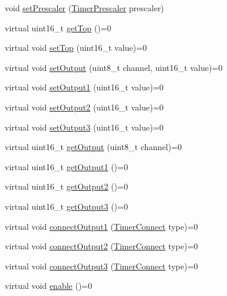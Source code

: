 \begin{DoxyCompactItemize}
void \hyperlink{classflame_1_1_timer_a3a937b5424a565d63308aad19254fe7f}{set\-Prescaler} (\hyperlink{namespaceflame_a24dfd057ba5ab5a827abbc4ed902a087}{Timer\-Prescaler} prescaler)
\item 
virtual uint16\-\_\-t \hyperlink{classflame_1_1_timer_ae7531c4df336c5c70e751581c3c37b4c}{get\-Top} ()=0
\item 
virtual void \hyperlink{classflame_1_1_timer_a32523c61b521a74fe4c21cff0332a9e7}{set\-Top} (uint16\-\_\-t value)=0
\item 
virtual void \hyperlink{classflame_1_1_timer_a7eb534c6d2b55b329207d8e8f8f7538c}{set\-Output} (uint8\-\_\-t channel, uint16\-\_\-t value)=0
\item 
virtual void \hyperlink{classflame_1_1_timer_ad5ebb60ff42ff1e8808d867da1d2dfac}{set\-Output1} (uint16\-\_\-t value)=0
\item 
virtual void \hyperlink{classflame_1_1_timer_ac9844c4f69ff804e754d74a4a07a1208}{set\-Output2} (uint16\-\_\-t value)=0
\item 
virtual void \hyperlink{classflame_1_1_timer_a542f70b81da2198bb6839ae15980dea2}{set\-Output3} (uint16\-\_\-t value)=0
\item 
virtual uint16\-\_\-t \hyperlink{classflame_1_1_timer_a29af3ec15a5669430a95a83727097432}{get\-Output} (uint8\-\_\-t channel)=0
\item 
virtual uint16\-\_\-t \hyperlink{classflame_1_1_timer_af9cd331d2da4bd5996473469b2454062}{get\-Output1} ()=0
\item 
virtual uint16\-\_\-t \hyperlink{classflame_1_1_timer_a02a423f8bbd41bf2acacdb60e2164c71}{get\-Output2} ()=0
\item 
virtual uint16\-\_\-t \hyperlink{classflame_1_1_timer_aded92bd6883a00c8c792ab45df1ad580}{get\-Output3} ()=0
\item 
virtual void \hyperlink{classflame_1_1_timer_abb864ec27afbf978d4367fb2d58436e9}{connect\-Output1} (\hyperlink{namespaceflame_ae65577f52d5a5d4ce0cc5a4b85fb9ba9}{Timer\-Connect} type)=0
\item 
virtual void \hyperlink{classflame_1_1_timer_a8953b248ee5a1749ea54d571b3254805}{connect\-Output2} (\hyperlink{namespaceflame_ae65577f52d5a5d4ce0cc5a4b85fb9ba9}{Timer\-Connect} type)=0
\item 
virtual void \hyperlink{classflame_1_1_timer_ac2de7ddb1623fe93e3e5852d6893c005}{connect\-Output3} (\hyperlink{namespaceflame_ae65577f52d5a5d4ce0cc5a4b85fb9ba9}{Timer\-Connect} type)=0
\item 
virtual void \hyperlink{classflame_1_1_timer_a93d5856122c3df8087cadade3992fb75}{enable} ()=0

\end{DoxyCompactItemize}

